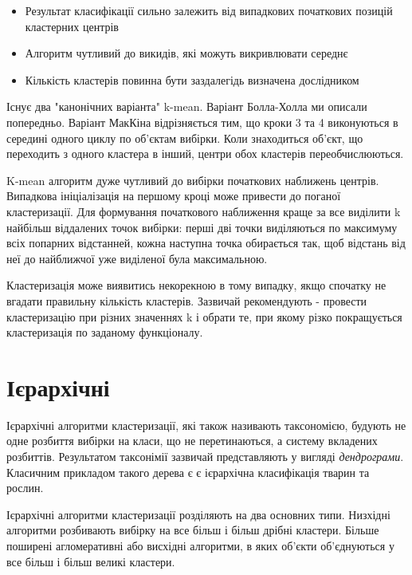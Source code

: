 \documentclass[a4paper,14pt,russian]{extreport}
\begin{document}
\begin{itemize}

  \item  Результат класифікації сильно залежить від випадкових початкових позицій кластерних центрів
\item    Алгоритм чутливий до викидів, які можуть викривлювати середнє
\item     Кількість кластерів повинна бути заздалегідь визначена дослідником

\end{itemize}	
\par 
Існує два "канонічних варіанта"  k-mean. Варіант Болла-Холла \cite[ст. 110]{wiliams} ми описали попередньо. Варіант МакКіна \cite[ст. 98]{wiliams} відрізняється тим, що кроки 3 та 4 виконуються в середині одного циклу по об'єктам вибірки. Коли знаходиться об'єкт, що переходить з одного кластера в інший, центри обох кластерів переобчислюються.\par 
K-mean алгоритм дуже чутливий до вибірки початкових наближень центрів. Випадкова ініціалізація на першому кроці може привести до поганої кластеризації. Для формування початкового наближення краще за все виділити  k найбільш віддалених точок вибірки: перші дві точки виділяються по максимуму всіх попарних відстанней, кожна наступна точка обирається так, щоб відстань від неї до найближчої уже виділеної була максимальною. \par 
Кластеризація може виявитись некорекною в тому випадку, якщо спочатку не вгадати правильну кількість кластерів. Зазвичай рекомендують  - провести кластеризацію при різних значеннях k і обрати те, при якому різко покращується кластеризація по заданому функціоналу.
	
	\section{Ієрархічні}
	Ієрархічні алгоритми кластеризації, які також називають таксономією, будують не одне розбиття вибірки на класи, що не перетинаються, а систему вкладених розбиттів. Результатом таксонімії зазвичай представляють у вигляді \textit{дендрограми}. Класичним прикладом такого дерева є є ієрархічна класифікація тварин та рослин. \par
Ієрархічні алгоритми кластеризації розділяють на два основних типи. 
Низхідні алгоритми розбивають вибірку на все більш і більш
дрібні кластери. Більше поширені
агломеративні
або висхідні алгоритми, в яких об'єкти об'єднуються у все більш і більш великі кластери.
\end{document}
